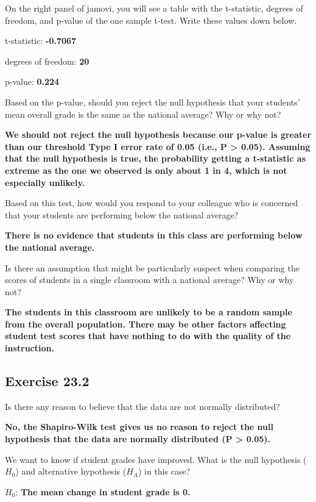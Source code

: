 \documentclass[
  openany]{krantz}
\begin{document}
On the right panel of jamovi, you will see a table with the t-statistic, degrees of freedom, and p-value of the one sample t-test. Write these values down below.

t-statistic: \textbf{-0.7067}

degrees of freedom: \textbf{20}

p-value: \textbf{0.224}

Based on the p-value, should you reject the null hypothesis that your students' mean overall grade is the same as the national average? Why or why not?

\textbf{We should not reject the null hypothesis because our p-value is greater than our threshold Type I error rate of 0.05 (i.e., P \textgreater{} 0.05). Assuming that the null hypothesis is true, the probability getting a t-statistic as extreme as the one we observed is only about 1 in 4, which is not especially unlikely.}

Based on this test, how would you respond to your colleague who is concerned that your students are performing below the national average?

\textbf{There is no evidence that students in this class are performing below the national average.}

Is there an assumption that might be particularly suspect when comparing the scores of students in a single classroom with a national average? Why or why not?

\textbf{The students in this classroom are unlikely to be a random sample from the overall population. There may be other factors affecting student test scores that have nothing to do with the quality of the instruction.}

\hypertarget{exercise-23.2}{%
\subsection{Exercise 23.2}\label{exercise-23.2}}

Is there any reason to believe that the data are not normally distributed?

\textbf{No, the Shapiro-Wilk test gives us no reason to reject the null hypothesis that the data are normally distributed (P \textgreater{} 0.05).}

We want to know if student grades have improved. What is the null hypothesis (\(H_{0}\)) and alternative hypothesis (\(H_{A}\)) in this case?

\(H_{0}\): \textbf{The mean change in student grade is 0.}
\end{document}
